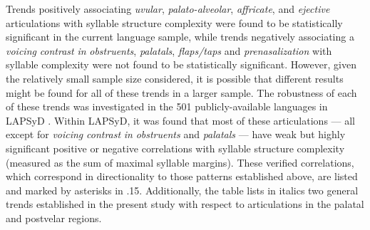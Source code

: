   Trends positively associating \textit{uvular}, \textit{palato-alveolar}, \textit{affricate}, and \textit{ejective} articulations with syllable structure complexity were found to be statistically significant in the current language sample, while trends negatively associating a \textit{voicing} \textit{contrast} \textit{in} \textit{obstruents}, \textit{palatals}, \textit{flaps/taps} and \textit{prenasalization} with syllable complexity were not found to be statistically significant. However, given the relatively small sample size considered, it is possible that different results might be found for all of these trends in a larger sample. The robustness of each of these trends was investigated in the 501 publicly-available languages in LAPSyD \citep{MaddiesonEtAl2013}. Within LAPSyD, it was found that most of these articulations — all except for \textit{voicing} \textit{contrast} \textit{in} \textit{obstruents} and \textit{palatals} — have weak but highly significant positive or negative correlations with syllable structure complexity (measured as the sum of maximal syllable margins). These verified correlations, which correspond in directionality to those patterns established above, are listed and marked by asterisks in .15. Additionally, the table lists in italics two general trends established in the present study with respect to articulations in the palatal and postvelar regions.


